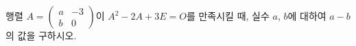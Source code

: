 \hspace*{2mm}\begin{minipage}[t]{\dimexpr\linewidth-2mm\relax}\vspace{0pt}
행렬 $A=\begin{pmatrix} a & -3 \\ b & 0 \end{pmatrix}$이 $A^2-2A+3E=O$를 만족시킬 때, 실수 $a$, $b$에 대하여 $a-b$의 값을 구하시오.\end{minipage}

